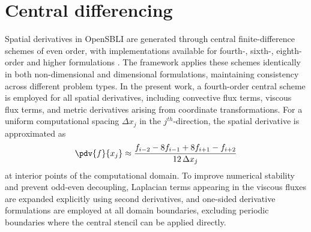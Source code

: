 \section{Central differencing}
Spatial derivatives in OpenSBLI are generated through central finite-difference schemes of even order, with implementations available for fourth-, sixth-, eighth-order and higher formulations \citep{LusherEtAl2025,RegulyMudaligeGiles2018}. The framework applies these schemes identically in both non-dimensional and dimensional formulations, maintaining consistency across different problem types. In the present work, a fourth-order central scheme is employed for all spatial derivatives, including convective flux terms, viscous flux terms, and metric derivatives arising from coordinate transformations. For a uniform computational spacing $\Delta x_j$ in the $j^{th}$-direction, the spatial derivative is approximated as
\begin{equation}
    \pdv{f}{x_j} \approx \frac{f_{i-2} - 8 f_{i-1} + 8 f_{i+1} - f_{i+2}}{12 \,\Delta x_j}
\end{equation}
at interior points of the computational domain. To improve numerical stability and prevent odd-even decoupling, Laplacian terms appearing in the viscous fluxes are expanded explicitly using second derivatives, and one-sided derivative formulations are employed at all domain boundaries, excluding periodic boundaries where the central stencil can be applied directly.

